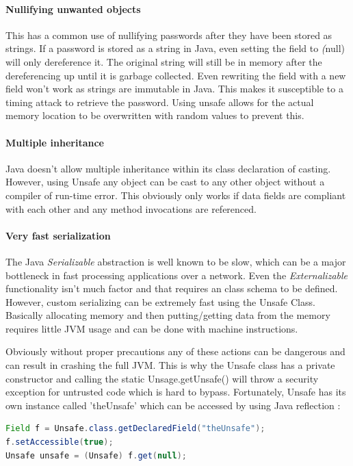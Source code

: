 \documentclass[final_report.tex]{subfiles}
\begin{document}
\paragraph*{Nullifying unwanted objects}
This has a common use of nullifying passwords after they have been stored as strings. If a password is stored as a string in Java, even setting the field to \textit(null) will only dereference it. The original string will still be in memory after the dereferencing up until it is garbage collected. Even rewriting the field with a new field won't work as strings are immutable in Java. This makes it susceptible to a timing attack to retrieve the password. Using unsafe allows for the actual memory location to be overwritten with random values to prevent this.

\paragraph*{Multiple inheritance}
Java doesn't allow multiple inheritance within its class declaration of casting. However, using Unsafe any object can be cast to any other object without a compiler of run-time error. This obviously only works if data fields are compliant with each other and any method invocations are referenced. 

\paragraph*{Very fast serialization}
The Java \textit{Serializable} abstraction is well known to be slow, which can be a major bottleneck in fast processing applications over a network. Even the \textit{Externalizable} functionality isn't much factor and that requires an class schema to be defined. However, custom serializing can be extremely fast using the Unsafe Class. Basically allocating memory and then putting/getting data from the memory requires little JVM usage and can be done with machine instructions.

Obviously without proper precautions any of these actions can be dangerous and can result in crashing the full JVM. This is why the Unsafe class has a private constructor and calling the static Unsage.getUnsafe() will throw a security exception for untrusted code which is hard to bypass. Fortunately, Unsafe has its own instance called 'theUnsafe' which can be accessed by using Java reflection :

\begin{lstlisting}[language=Java, caption={Accessing Java Unsafe}, label=lst:java_unsafe]
Field f = Unsafe.class.getDeclaredField("theUnsafe");
f.setAccessible(true);
Unsafe unsafe = (Unsafe) f.get(null);
\end{lstlisting}
\end{document}
